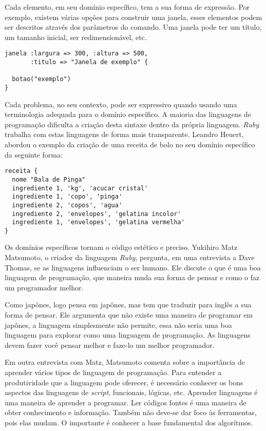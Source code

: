 \documentclass[espaco=simples,appendix=Name]{abnt}
\begin{document}
Cada elemento, em seu domínio específico, tem a sua forma de expressão. Por exemplo,  existem várias opções para construir uma janela, esses elementos podem ser descritos através dos parâmetros do comando. Uma janela pode ter um título, um tamanho inicial, ser redimensionável, etc.

\begin{lstlisting}[label=exemplo janela, caption=Expressividade da construção de uma janela]
janela :largura => 300, :altura => 500, 
       :titulo => "Janela de exemplo" {

  botao("exemplo")
}
\end{lstlisting}


Cada problema, no seu contexto, pode ser expressivo quando usando uma terminologia adequada para o domínio específico. A maioria das linguagens de programação dificulta a criação desta sintaxe dentro da própria linguagem. \textit{Ruby} trabalha com estas linguagens de forma mais transparente. Leandro Heuert\cite{dslLeandro}, abordou o exemplo da criação de uma receita de bolo no seu domínio específico da seguinte forma: 

\begin{lstlisting}[label=exemplo receita, caption=Expressividade de uma receita no seu domínio específico\cite{dslLeandro}]
receita {
  nome "Bala de Pinga"
  ingrediente 1, 'kg', 'acucar cristal'
  ingrediente 1, 'copo', 'pinga'
  ingrediente 2, 'copos', 'agua'
  ingrediente 2, 'envelopes', 'gelatina incolor'
  ingrediente 1, 'envelopes', 'gelatina vermelha'
}
\end{lstlisting}

Os domínios específicos tornam o código estético e preciso. Yukihiro Matz Matsumoto, o criador da linguagem \textit{Ruby}, pergunta, em uma entrevista a Dave Thomas, se as linguagens influenciam o ser humano. Ele discute o que é uma boa linguagem de programação, que maneira muda sua forma de pensar e como o faz um programador melhor.

Como japônes, logo pensa em japônes, mas tem que traduzir para inglês a sua forma de pensar. Ele argumenta que não existe uma maneira de programar em japônes, a linguagem simplesmente não permite, essa não seria uma boa linguagem para explorar como uma linguagem de programação. As linguagens devem fazer você pensar melhor e faze-lo um melhor programador.\cite{programmingRuby}



Em outra entrevista \cite{entrevistaDivertidaComMatz} com Matz, Matsumoto comenta sobre a importância de aprender vários tipos de linguagem de programação. Para entender a produtividade que a linguagem pode oferecer, é necessário conhecer os bons aspectos das linguagens de \textit{script}, funcionais, lógicas, etc. Aprender linguagens é uma maneira de aprender a programar. Ler códigos fontes é uma maneira de obter conhecimento e informação. Também não deve-se dar foco às ferramentas, pois elas mudam. O importante é conhecer a base fundamental dos algorítmos.
\end{document}
